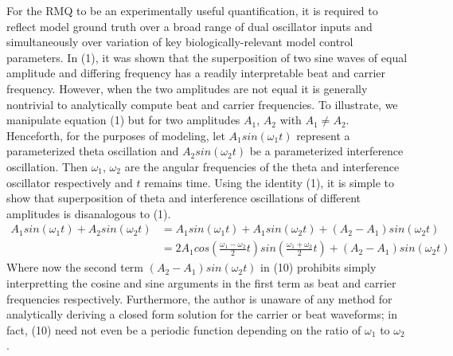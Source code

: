 \documentclass[12pt, letterpaper]{article}
\newenvironment{collapsable}{}{}
\begin{document}
\begin{collapsable}
  \vspace{12pt}

  For the RMQ to be an experimentally useful quantification, it is required to
  reflect model ground truth over a broad range of dual oscillator inputs and
  simultaneously over variation of key biologically-relevant model control
  parameters. In (1), it was shown that the superposition of two sine
  waves of equal amplitude and differing frequency has a readily interpretable beat
  and carrier frequency. However, when the two amplitudes are not equal it is
  generally nontrivial to analytically compute beat and carrier frequencies. To illustrate, we
  manipulate equation (1) but for two amplitudes $A_1$, $A_2$ with $A_1\neq
  A_2$. Henceforth, for the purposes of modeling, let $A_1sin(\omega_1t)$
  represent a parameterized theta oscillation and $A_2sin(\omega_2t)$ be a
  parameterized interference oscillation.
  Then $\omega_1$, $\omega_2$ are the angular frequencies of the theta and interference
  oscillator respectively and $t$ remains time. Using the identity (1), it is
  simple to show that superposition of theta and interference oscillations of
  different amplitudes is disanalogous to (1).
  \begin{align*}
    A_1sin(\omega_1t) + A_2sin(\omega_2t)&=A_1sin(\omega_1t) + A_1sin(\omega_2t) + (A_2-A_1)sin(\omega_2t)\\
    &=2A_1cos\left(\frac{\omega_1-\omega_2}{2}t\right)sin\left(\frac{\omega_1+\omega_2}{2}t\right) + (A_2-A_1)sin(\omega_2t)\tag{10}
  \end{align*}
  Where now the second term $(A_2-A_1)sin(\omega_2t)$ in (10) prohibits simply
  interpretting the cosine and sine arguments in the first term as beat and carrier frequencies
  respectively. Furthermore, the author is unaware of any method for
  analytically deriving a closed form solution for the carrier or beat
  waveforms; in fact, (10) need not even be a periodic function depending on the
  ratio of $\omega_1$ to $\omega_2$.

  \vspace{12pt}


\end{collapsable}
\end{document}
